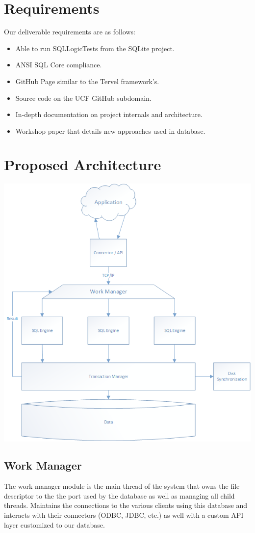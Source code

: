 \documentclass[letterpaper]{article}
\begin{document}
  \section{Requirements}
  Our deliverable requirements are as follows:
  \begin{itemize}
   \item Able to run SQLLogicTests from the SQLite project.
   \item ANSI SQL Core compliance.
   \item GitHub Page similar to the Tervel framework's.
   \item Source code on the UCF GitHub subdomain.
   \item In-depth documentation on project internals and architecture.
   \item Workshop paper that details new approaches used in database.
  \end{itemize}
  
  \section{Proposed Architecture}
  \includegraphics[scale=.70]{OpenMemDbDiagram.png}
  \subsection{Work Manager}
  The work manager module is the main thread of the system that owns the file descriptor to the the port used by the database as well as managing
  all child threads. Maintains the connections to the various clients using this database and interacts with their connectors (ODBC, JDBC, etc.)
  as well with a custom API layer customized to our database.
  
\end{document}
